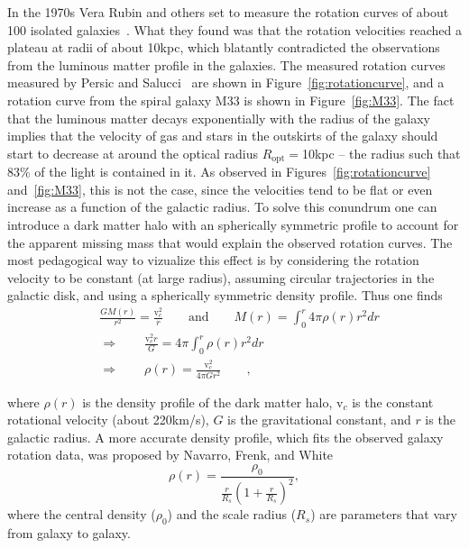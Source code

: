  In the 1970s Vera Rubin and others
set to measure the rotation curves of about 100 isolated
galaxies~\cite{rubin}. What they found was that the rotation
velocities reached a plateau at radii of about 10\unit{kpc}, which
blatantly contradicted the observations from the luminous matter
profile in the galaxies. The measured rotation curves measured by
Persic and Salucci~\cite{PandS} are shown in Figure~\ref{fig:rotationcurve}, and a
rotation curve from the spiral galaxy M33 is shown in
Figure~\ref{fig:M33}. The fact that the luminous matter decays
exponentially with the radius of the galaxy implies that  the velocity
of gas and stars in the outskirts of the galaxy should start to
decrease at around the optical radius $R_{\mathrm{opt}} = $10\unit{kpc} -- the radius
such that 83\% of the light is contained in it. As observed in
Figures~\ref{fig:rotationcurve} and~\ref{fig:M33}, this is not the case, since the
velocities tend to be flat or even increase as a function of the
galactic radius. To solve this conundrum one can introduce a dark
matter halo with an spherically symmetric profile to account for the
apparent missing mass that would explain the observed rotation
curves. The most pedagogical way to vizualize this effect is by
considering the rotation velocity to be constant (at large radius),
assuming  circular trajectories in the galactic disk, and using a
spherically symmetric density profile. Thus one finds
\begin{equation}
\label{eq:densityProfile}
\begin{aligned}
       &\frac{GM(r)}{r^{2}} = \frac{\mathrm{v}^{2}_{c}}{r} 
        \qquad \text{and}  \qquad  M(r) = \int^{r}_{0} 4\pi \rho(r) r^{2}dr\\
        & 
        \Rightarrow \qquad \frac{\mathrm{v}^{2}_{c}r}{G} = 4\pi
        \int^{r}_{0} \rho(r) r^{2}dr \qquad \text{}\\
        & \Rightarrow \qquad \rho(r) = \frac{\mathrm{v}^{2}_{c}}{4\pi
          G r^{2}}\qquad \text{},
       \end{aligned}
\end{equation}

where $\rho(r)$ is the density profile of the dark matter halo,
$\mathrm{v}_{c}$ is the constant rotational velocity (about
220\unit{km/s}), $G$ is the gravitational constant, and $r$ is the
galactic radius. A more accurate density profile, which fits the
observed galaxy rotation data, was proposed by Navarro, Frenk, and
White~\cite{NFW}
\begin{equation}
\rho(r) = \frac{\rho_{0}}{\frac{r}{R_{s}}\left( 1+\frac{r}{R_{s}}\right)^{2}},
\label{eq:NFW}
\end{equation}
where the central density ($\rho_{0}$) and the scale radius ($R_{s}$)
are parameters that vary from galaxy to galaxy.

